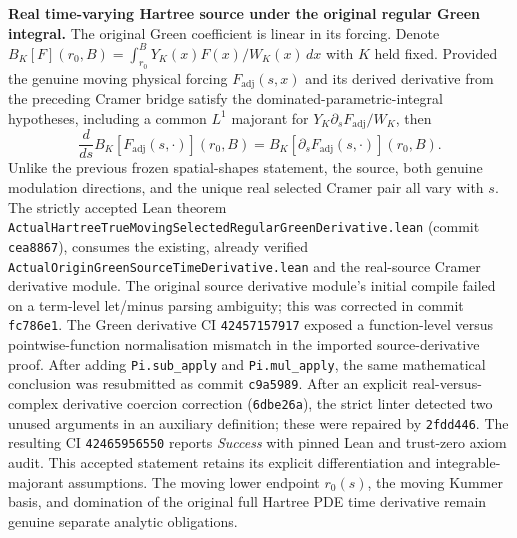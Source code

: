 \documentclass[11pt]{amsart}
\begin{document}
\medskip
\noindent\textbf{Real time-varying Hartree source under the original regular Green integral.}
The original Green coefficient is linear in its forcing. Denote
\(
 B_K[F](r_0,B)=
 \int_{r_0}^{B} Y_K(x)F(x)/W_K(x)\,dx
\)
with \(K\) held fixed. Provided the genuine moving physical forcing
\(F_{\mathrm{adj}}(s,x)\) and its derived derivative from the preceding
Cramer bridge satisfy the dominated-parametric-integral hypotheses,
including a common \(L^1\) majorant for
\(Y_K\partial_sF_{\mathrm{adj}}/W_K\), then
\[
 \frac{d}{ds}B_K[F_{\mathrm{adj}}(s,\cdot)](r_0,B)
 = B_K[\partial_sF_{\mathrm{adj}}(s,\cdot)](r_0,B).
\]
Unlike the previous frozen spatial-shapes statement, the source,
both genuine modulation directions, and the unique real selected
Cramer pair all vary with \(s\). The strictly accepted Lean theorem
\texttt{ActualHartreeTrueMovingSelectedRegularGreenDerivative.lean}
(commit \texttt{cea8867}), consumes the existing, already verified
\texttt{ActualOriginGreenSourceTimeDerivative.lean} and the
real-source Cramer derivative module. The original source derivative
module's initial compile failed on a term-level let/minus parsing
ambiguity; this was corrected in commit \texttt{fc786e1}.
The Green derivative CI \texttt{42457157917} exposed a
function-level versus pointwise-function normalisation mismatch
in the imported source-derivative proof. After adding
\texttt{Pi.sub\_apply} and \texttt{Pi.mul\_apply}, the
same mathematical conclusion was resubmitted as commit
\texttt{c9a5989}. After an explicit real-versus-complex derivative
coercion correction (\texttt{6dbe26a}), the strict linter detected
two unused arguments in an auxiliary definition; these were repaired
by \texttt{2fdd446}. The resulting CI \texttt{42465956550}
reports \emph{Success} with pinned Lean and trust-zero axiom audit.
This accepted statement retains its explicit differentiation and
integrable-majorant assumptions.
The moving lower endpoint \(r_0(s)\), the moving Kummer basis,
and domination of the original full Hartree PDE time derivative
remain genuine separate analytic obligations.
\end{document}
